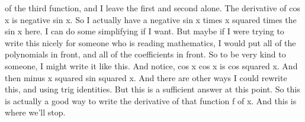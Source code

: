 \documentclass[pdftex, brazil, 12pt, twoside]{article}
\begin{document}
of the third function, and I leave the first and second
alone.
The derivative of cos x is negative sin x.
So I actually have a negative sin x times x
squared times the sin x here.
I can do some simplifying if I want.
But maybe if I were trying to write this nicely
for someone who is reading mathematics,
I would put all of the polynomials in front,
and all of the coefficients in front.
So to be very kind to someone, I might write it like this.
And notice, cos x cos x is cos squared x.
And then minus x squared sin squared x.
And there are other ways I could rewrite this,
and using trig identities.
But this is a sufficient answer at this point.
So this is actually a good way to write
the derivative of that function f of x.
And this is where we'll stop.



    

























\end{document}
